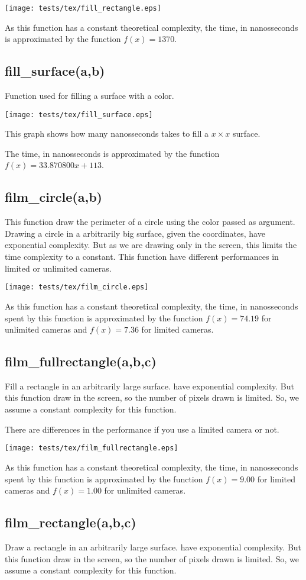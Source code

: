 \documentclass{article}
\begin{document}
\texttt{[image: tests/tex/fill\_rectangle.eps]}

As this function has a constant theoretical
complexity, the time, in nanosseconds is 
approximated by the function $f(x)=1370$.
\subsection{fill\_surface(a,b)}
Function used for filling a surface with a color.

\texttt{[image: tests/tex/fill\_surface.eps]}

This graph shows how many nanosseconds takes to fill a $x \times x$ surface.

The time, in nanosseconds is 
approximated by the function $f(x)=33.870800x+113$.
\subsection{film\_circle(a,b)}
This function draw the perimeter of a circle using
the color passed as argument. Drawing a
circle in a arbitrarily big surface, given the
coordinates, have exponential complexity. But as
we are drawing only in the screen, this limits 
the time complexity to a constant. This function
have different performances in limited or unlimited
cameras.

\texttt{[image: tests/tex/film\_circle.eps]}

As this function has a constant
theoretical complexity, the time, in nanosseconds
spent by this function is 
approximated by the function $f(x)=74.19$
for unlimited cameras and $f(x)=7.36$ for
limited cameras.
\subsection{film\_fullrectangle(a,b,c)}
Fill a rectangle in an arbitrarily large surface.
have exponential complexity. But this function
draw in the screen, so the number of pixels drawn
is limited. So, we assume a constant complexity
for this function.

There are differences in the performance if you use
a limited camera or not.

\texttt{[image: tests/tex/film\_fullrectangle.eps]}

As this function has a constant
theoretical complexity, the time, in nanosseconds
spent by this function is 
approximated by the function $f(x)=9.00$
for limited cameras and $f(x)=1.00$ for
unlimited cameras.
\subsection{film\_rectangle(a,b,c)}
Draw a rectangle in an arbitrarily large surface.
have exponential complexity. But this function
draw in the screen, so the number of pixels drawn
is limited. So, we assume a constant complexity
for this function.
\end{document}
